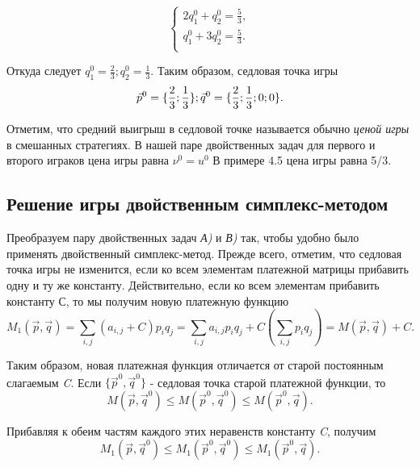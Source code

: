 \begin{equation}
\label{equation_4_31}
    \begin{cases}
    2q_1^0 + q_2^0 = \frac{5}{3},  \\
    q_1^0 + 3q_2^0 = \frac{5}{3}.  \\
    \end{cases}
\end{equation}

Откуда следует $q_1^0 = \frac{2}{3}; q_2^0 = \frac{1}{3}.$ Таким образом, седловая точка игры
\begin{equation}
\label{equation_4_32}
   \vec{p}^0 = \large \{\frac{2}{3}; \frac{1}{3}\} \normalsize;  \vec{q}^0 = \large \{\frac{2}{3}; \frac{1}{3}; 0; 0\} \normalsize.
\end{equation}

Отметим, что средний выигрыш в седловой точке называется обычно \emph{ценой игры} в смешанных стратегиях. В нашей паре двойственных задач для первого и второго играков цена игры равна $\nu^0 = u^0$ В примере 4.5 цена игры равна 5/3.
\subsection{Решение игры двойственным симплекс-методом}

Преобразуем пару двойственных задач \emph{А)} и \emph{В)} так, чтобы удобно было применять  двойственный симплекс-метод. Прежде всего, отметим, что седловая точка игры не изменится, если ко всем элементам платежной матрицы прибавить одну и ту же константу. Действительно, если ко всем элементам прибавить константу С, то мы получим новую платежную функцию
\begin{equation}
\label{equation_4_33}
M_{1}(\vec{p}, \vec{q}) = \sum\limits_{i, j}(a_{i,j}+C)p_{i}q_{j} =
\sum\limits_{i, j}a_{i,j}p_{i}q_{j}+C\left(\sum\limits_{i, j}p_{i}q_{j}\right)=M(\vec{p}, \vec{q})+C.
\end{equation}

Таким образом, новая платежная функция отличается от старой постоянным слагаемым \emph{C}. Если $\{{\vec{p}^0, \vec{q}^0}\}$ - седловая точка старой платежной функции, то
\begin{equation}
\label{equation_4_34}
M(\vec{p}, \vec{q}^0) \leqslant M(\vec{p}^0, \vec{q}^0) \leqslant M(\vec{p}^0, \vec{q}).
\end{equation}

Прибавляя к обеим частям каждого этих неравенств константу \emph{C}, получим
\begin{equation}
\label{equation_4_35}
M_1(\vec{p}, \vec{q}^0) \leqslant M_1(\vec{p}^0, \vec{q}^0) \leqslant M_1(\vec{p}^0, \vec{q}).
\end{equation}

